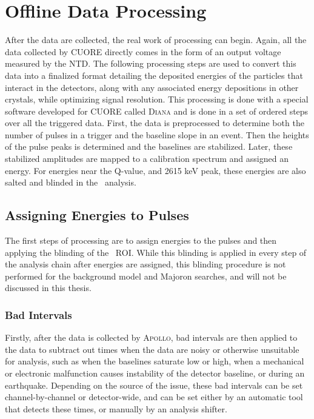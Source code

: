 \section{Offline Data Processing}
After the data are collected, the real work of processing can begin.
Again, all the data collected by CUORE directly comes in the form of an output voltage measured by the NTD.
The following processing steps are used to convert this data into a finalized format detailing the deposited energies of the particles that interact in the detectors, along with any associated energy depositions in other crystals, while optimizing signal resolution.
This processing is done with a special software developed for CUORE called \textsc{Diana} and is done in a set of ordered steps over all the triggered data.
First, the data is preprocessed to determine both the number of pulses in a trigger and the baseline slope in an event. 
Then the heights of the pulse peaks is determined and the baselines are stabilized.
Later, these stabilized amplitudes are mapped to a calibration spectrum and assigned an energy.
For energies near the \zeronubb Q-value, and 2615 keV peak, these energies are also salted and blinded in the \zeronubb~analysis.

\subsection*{Assigning Energies to Pulses}
The first steps of processing are to assign energies to the pulses and then applying the blinding of the \zeronubb~ROI.
While this blinding is applied in every step of the analysis chain after energies are assigned, this blinding procedure is not performed for the background model and Majoron searches, and will not be discussed in this thesis.

\subsubsection*{Bad Intervals}
Firstly, after the data is collected by \textsc{Apollo}, bad intervals are then applied to the data to subtract out times when the data are noisy or otherwise unsuitable for analysis, such as when the baselines saturate low or high, when a mechanical or electronic malfunction causes instability of the detector baseline, or during an earthquake.
Depending on the source of the issue, these bad intervals can be set channel-by-channel or detector-wide, and can be set either by an automatic tool that detects these times, or manually by an analysis shifter.

